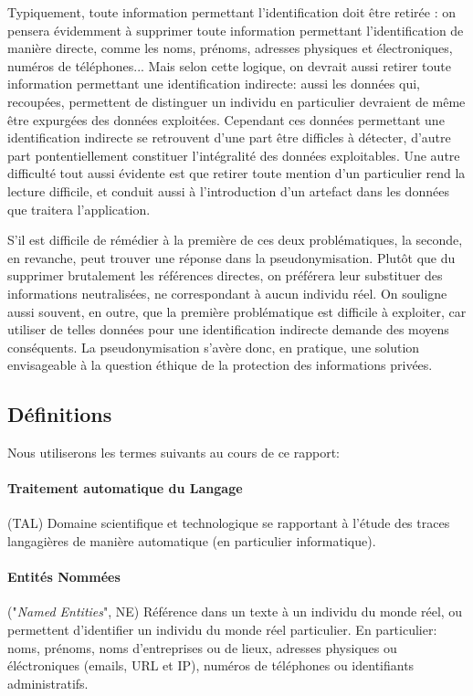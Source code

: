 \documentclass{article}
\begin{document}
Typiquement, toute information permettant l'identification doit être retirée : on pensera évidemment à supprimer toute information permettant l'identification de manière directe, comme les noms, prénoms, adresses physiques et électroniques, numéros de téléphones...
Mais selon cette logique, on devrait aussi retirer toute information permettant une identification indirecte: aussi les données qui, recoupées, permettent de distinguer un individu en particulier devraient de même être expurgées des données exploitées.
Cependant ces données permettant une identification indirecte se retrouvent d'une part être difficles à détecter, d'autre part pontentiellement constituer l'intégralité des données exploitables.
Une autre difficulté tout aussi évidente est que retirer toute mention d'un particulier rend la lecture difficile, et conduit aussi à l'introduction d'un artefact dans les données que traitera l'application.
\par
S'il est difficile de rémédier à la première de ces deux problématiques, la seconde, en revanche, peut trouver une réponse dans la pseudonymisation.
Plutôt que du supprimer brutalement les références directes, on préférera leur substituer des informations neutralisées, ne correspondant à aucun individu réel.
On souligne aussi souvent, en outre, que la première problématique est difficile à exploiter, car utiliser de telles données pour une identification indirecte demande des moyens conséquents.
La pseudonymisation s'avère donc, en pratique, une solution envisageable à la question éthique de la protection des informations privées.

\subsection{Définitions}
Nous utiliserons les termes suivants au cours de ce rapport:
\paragraph{Traitement automatique du Langage} (TAL) Domaine scientifique et technologique se rapportant à l'étude des traces langagières de manière automatique (en particulier informatique).
\paragraph{Entités Nommées} ("\textit{Named Entities}", NE) Référence dans un texte à un individu du monde réel, ou permettent d'identifier un individu du monde réel particulier.
En particulier: noms, prénoms, noms d'entreprises ou de lieux, adresses physiques ou éléctroniques (emails, URL et IP), numéros de téléphones ou identifiants administratifs.
\end{document}
